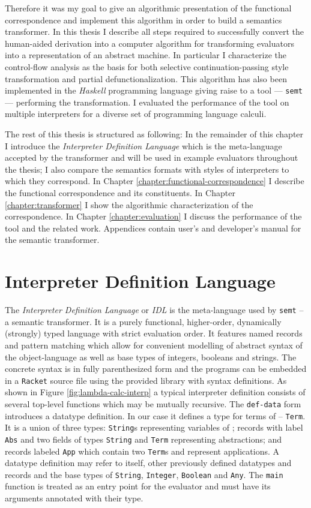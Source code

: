 Therefore it was my goal to give an algorithmic presentation of the functional correspondence and implement this algorithm in order to build a semantics transformer.
In this thesis I describe all steps required to successfully convert the human-aided derivation into a computer algorithm for transforming evaluators into a representation of an abstract machine.
In particular I characterize the control-flow analysis as the basis for both selective continuation-passing style transformation and partial defunctionalization.
This algorithm has also been implemented in the \emph{Haskell} programming language giving raise to a tool --- \texttt{semt} --- performing the transformation.
I evaluated the performance of the tool on multiple interpreters for a diverse set of programming language calculi.

The rest of this thesis is structured as following:
In the remainder of this chapter I introduce the \textit{Interpreter Definition Language} which is the meta-language accepted by the transformer and will be used in example evaluators throughout the thesis; I also compare the semantics formats with styles of interpreters to which they correspond.
In Chapter \ref{chapter:functional-correspondence} I describe the functional correspondence and its constituents.
In Chapter \ref{chapter:transformer} I show the algorithmic characterization of the correspondence.
In Chapter \ref{chapter:evaluation} I discuss the performance of the tool and the related work.
Appendices contain user's and developer's manual for the semantic transformer.

\section{Interpreter Definition Language}\label{sec:idl}
The \emph{Interpreter Definition Language} or \emph{IDL} is the meta-language used by \texttt{semt} -- a semantic transformer.
It is a purely functional, higher-order, dynamically (strongly) typed language with strict evaluation order.
It features named records and pattern matching which allow for convenient modelling of abstract syntax of the object-language as well as base types of integers, booleans and strings.
The concrete syntax is in fully parenthesized form and the programs can be embedded in a \texttt{Racket} source file using the provided library with syntax definitions.
As shown in Figure \ref{fig:lambda-calc-interp} a typical interpreter definition consists of several top-level functions which may be mutually recursive.
The \lstinline!def-data! form introduces a datatype definition.
In our case it defines a type for terms of \LC{} -- \lstinline!Term!.
It is a union of three types: \lstinline!String!s representing variables of \LC{}; records with label \lstinline!Abs! and two fields of types \lstinline!String! and \lstinline!Term! representing abstractions; and records labeled \lstinline!App! which contain two \lstinline!Term!s and represent applications.
A datatype definition may refer to itself, other previously defined datatypes and records and the base types of \lstinline!String!, \lstinline!Integer!, \lstinline!Boolean! and \lstinline!Any!.
The \texttt{main} function is treated as an entry point for the evaluator and must have its arguments annotated with their type.

